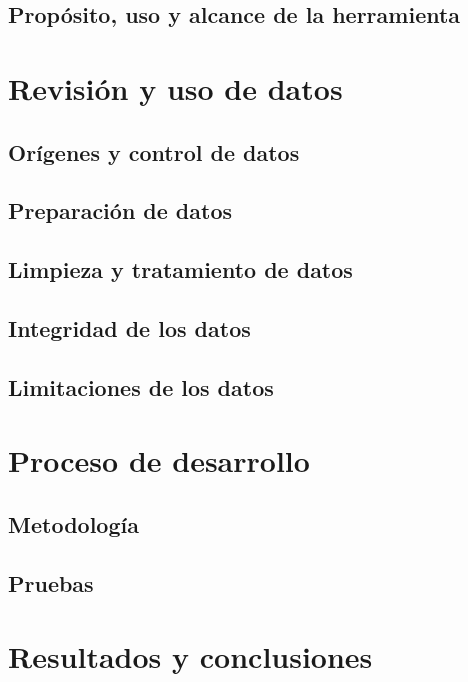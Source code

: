 \documentclass[10pt]{article}
\begin{document}
\subsection{Propósito, uso y alcance de la herramienta}
\section{Revisión y uso de datos}
\subsection{Orígenes y control de datos}
\subsection{Preparación de datos}
\subsection{Limpieza y tratamiento de datos}
\subsection{Integridad de los datos}
\subsection{Limitaciones de los datos}
\section{Proceso de desarrollo}
\subsection{Metodología}
\subsection{Pruebas}

\section{Resultados y conclusiones}
\end{document}
